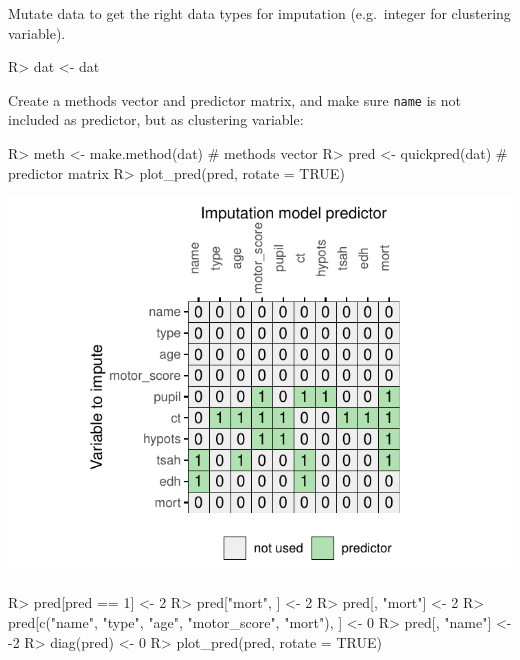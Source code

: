 \documentclass[
]{jss}
\begin{document}
Mutate data to get the right data types for imputation (e.g.~integer for
clustering variable).

\begin{CodeChunk}
\begin{CodeInput}
R> dat <- dat %
\end{CodeInput}
\end{CodeChunk}

Create a methods vector and predictor matrix, and make sure
\texttt{name} is not included as predictor, but as clustering variable:

\begin{CodeChunk}
\begin{CodeInput}
R> meth <- make.method(dat) # methods vector
R> pred <- quickpred(dat)   # predictor matrix
R> plot_pred(pred, rotate = TRUE)
\end{CodeInput}


\begin{center}\includegraphics{Imputation_of_Incomplete_Multilevel_Data_files/figure-latex/impact-1} \end{center}

\begin{CodeInput}
R> pred[pred == 1] <- 2
R> pred["mort", ] <- 2
R> pred[, "mort"] <- 2
R> pred[c("name", "type", "age", "motor_score", "mort"), ] <- 0
R> pred[, "name"] <- -2
R> diag(pred) <- 0
R> plot_pred(pred, rotate = TRUE)
\end{CodeInput}



\end{CodeChunk}
\end{document}
